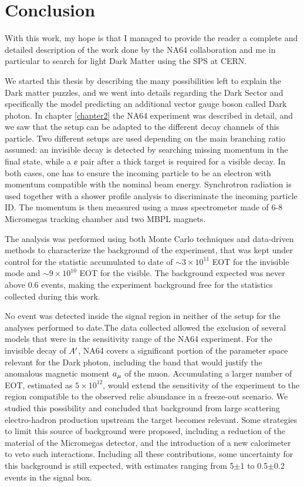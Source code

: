 
\chapter{Conclusion} %

\label{chapter6}

With this work, my hope is that I managed to provide the reader a complete and detailed description of the work done by the NA64 collaboration and me in particular to search for light Dark Matter using the SPS at CERN.

We started this thesis by describing the many possibilities left to explain the Dark matter puzzles, and we went into details regarding the Dark Sector and specifically the model predicting an additional vector gauge boson called Dark photon. In chapter \ref{chapter2} the NA64 experiment was described in detail, and we saw that the setup can be adapted to the different decay channels of this particle. Two different setups are used depending on the main branching ratio assumed: an invisible decay is detected by searching missing momentum in the final state, while a $\ee$ pair after a thick target is required for a visible decay. In both cases, one has to ensure the incoming particle to be an electron with momentum compatible with the nominal beam energy. Synchrotron radiation is used together with a shower profile analysis to discriminate the incoming particle ID. The momentum is then measured using a mass spectrometer made of 6-8 Micromegas tracking chamber and two MBPL magnets.

The analysis was performed using both Monte Carlo techniques and data-driven methods to characterize the background of the experiment, that was kept under control for the statistic accumulated to date of $\sim 3 \times 10^{11}$ EOT for the invisible mode and $\sim 9 \times 10^{10}$ EOT for the visible. The background expected was never above 0.6 events, making the experiment background free for the statistics collected during this work.

No event was detected inside the signal region in neither of the setup for the analyses performed to date.The data collected allowed the exclusion of several models that were in the sensitivity range of the NA64 experiment. For the invisible decay of $A'$, NA64 covers a significant portion of the parameter space relevant for the Dark photon, including the band that would justify the anomalous magnetic moment $a_{\mu}$ of the muon. Accumulating a larger number of EOT, estimated as $5 \times 10^{12}$, would extend the sensitivity of the experiment to the region compatible to the observed relic abundance in a freeze-out scenario. We studied this possibility and concluded that background from large scattering electro-hadron production upstream the target becomes relevant. Some strategies to limit this source of background were proposed, including a reduction of the material of the Micromegas detector, and the introduction of a new calorimeter to veto such interactions. Including all these contributions, some uncertainty for this background is still expected, with estimates ranging from 5$\pm$1 to 0.5$\pm$0.2 events in the signal box.

